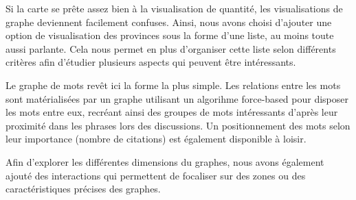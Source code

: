 Si la carte se prête assez bien à la visualisation de quantité,
les visualisations de graphe deviennent facilement confuses. Ainsi,
nous avons choisi d{\textquoteright}ajouter une option de visualisation
des provinces sous la forme d{\textquoteright}une liste, au moins toute
aussi parlante. Cela nous permet en plus d{\textquoteright}organiser
cette liste selon différents critères afin
d{\textquoteright}étudier plusieurs aspects qui peuvent être
intéressants.

Le graphe de mots revêt ici la forme la plus simple. Les relations
entre les mots sont matérialisées par un graphe utilisant un
algorihme force-based pour disposer les mots entre eux, recréant
ainsi des groupes de mots intéressants d{\textquoteright}après leur
proximité dans les phrases lors des discussions. Un positionnement
des mots selon leur importance (nombre de citations) est également
disponible à loisir.

Afin d{\textquoteright}explorer les différentes dimensions du graphes,
nous avons également ajouté des interactions qui permettent de
focaliser sur des zones ou des caractéristiques précises des
graphes. \citep{Bostock2011}

